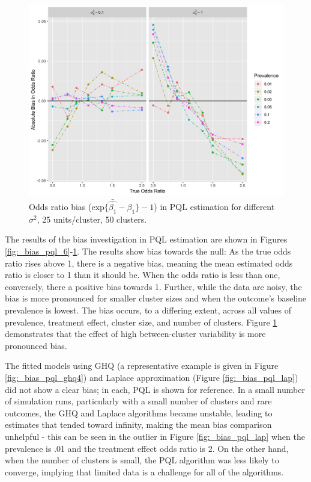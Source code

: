 \documentclass[Afour,times,sagev,doublespace]{sagej}
\begin{document}
\begin{figure}
\centering
\includegraphics[width=\linewidth]{_bias_pql_sbs_p25_n50.png}
  \caption{Odds ratio bias ($\text{exp} \{ \bar{\hat{\beta_1}} - \beta_1 \}-1$) in PQL estimation for different $\sigma^2$, 25 units/cluster, 50 clusters.}
    \label{fig:_bias_pql_sbs_single_comparison}
\end{figure}

The results of the bias investigation in PQL estimation are shown in Figures \ref{fig:_bias_pql_6}-\ref{fig:_bias_pql_sbs_single_comparison}. The results show bias towards the null: As the true odds ratio rises above 1, there is a negative bias, meaning the mean estimated odds ratio is closer to 1 than it should be. When the odds ratio is less than one, conversely, there a positive bias towards 1. Further, while the data are noisy, the bias is more pronounced for smaller cluster sizes and when the outcome's baseline prevalence is lowest. The bias occurs, to a differing extent, across all values of prevalence, treatment effect, cluster size, and number of clusters. Figure \ref{fig:_bias_pql_sbs_single_comparison} demonstrates that the effect of high between-cluster variability is more pronounced bias.

The fitted models using GHQ (a representative example is given in Figure \ref{fig:_bias_pql_ghq4}) and Laplace approximation (Figure \ref{fig:_bias_pql_lap}) did not show a clear bias; in each, PQL is shown for reference. In a small number of simulation runs, particularly with a small number of clusters and rare outcomes, the GHQ and Laplace algorithms became unstable, leading to estimates that tended toward infinity, making the mean bias comparison unhelpful - this can be seen in the outlier in Figure \ref{fig:_bias_pql_lap} when the prevalence is .01 and the treatment effect odds ratio is 2. On the other hand, when the number of clusters is small, the PQL algorithm was less likely to converge, implying that limited data is a challenge for all of the algorithms.
\end{document}
